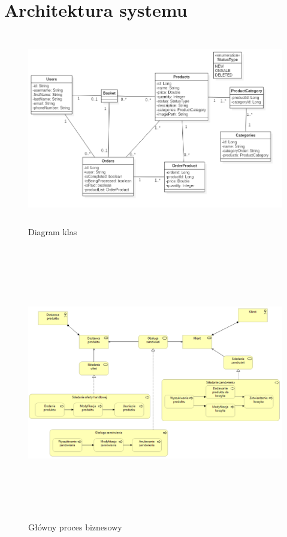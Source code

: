 \documentclass[11pt,a4paper,twoside]{article}
\begin{document}
\section{Architektura systemu}
\begin{figure}[ht]
\caption{Diagram klas}
\label{diagramKlas}
\centering
\includegraphics[height=8.4cm, width=15.7cm]{Klasy}
\end{figure}


\begin{figure}[ht]
\caption{Główny proces biznesowy}
\label{procesBiznesowy01}
\centering
\includegraphics[height=12cm, width=15.7cm]{01_biznes}
\end{figure}
\end{document}
